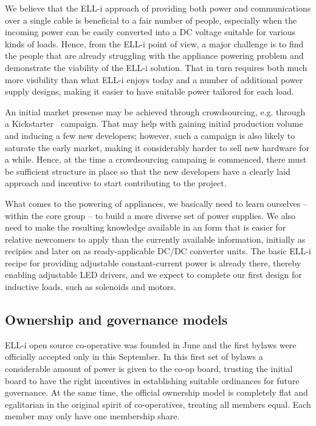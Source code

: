 \documentclass[draft,a4paper]{siamltex}
\begin{document}
We believe that the ELL-i approach of providing both power and
communications over a single cable is beneficial to a fair number of
people, especially when the incoming power can be easily converted
into a DC voltage suitable for various kinds of loads.  Hence, from
the ELL-i point of view, a major challenge is to find the people that
are already struggling with the appliance powering problem and
demonstrate the viability of the ELL-i solution.  That in turn
requires both much more visibility than what ELL-i enjoys today and a
number of additional power supply designs, making it easier to have
suitable power tailored for each load.

An initial market presense may be achieved through crowdsourcing,
e.g. through a Kickstarter~\cite{Kickstarter} campaign.  That may help
with gaining initial production volume and inducing a few new
developers; however, such a campaign is also likely to saturate the
early market, making it considerably harder to sell new hardware for a
while.  Hence, at the time a crowdsourcing campaing is commenced,
there must be sufficient structure in place so that the new developers
have a clearly laid approach and incentive to start contributing to
the project.

What comes to the powering of appliances, we basically need to learn
ourselves -- within the core group -- to build a more diverse set of
power supplies.  We also need to make the resulting knowledge
available in an form that is easier for relative newcomers to apply
than the currently available information, initially as recipies and
later on as ready-applicable DC/DC converter units.  The basic ELL-i
recipe for providing adjustable constant-current power is already
there, thereby enabling adjustable LED drivers, and we expect to
complete our first design for inductive loads, such as solenoids and
motors.

\subsection{Ownership and governance models}
\label{ssec:ownership}

ELL-i open source co-operative was founded in June and the first
bylaws were officially accepted only in this September.  In this first
set of bylaws a considerable amount of power is given to the co-op
board, trusting the initial board to have the right incentives in
establishing suitable ordinances for future governance.  At the same
time, the official ownership model is completely flat and egalitarian
in the original spirit of co-operatives, treating all members equal.
Each member may only have one membership share.
\end{document}
